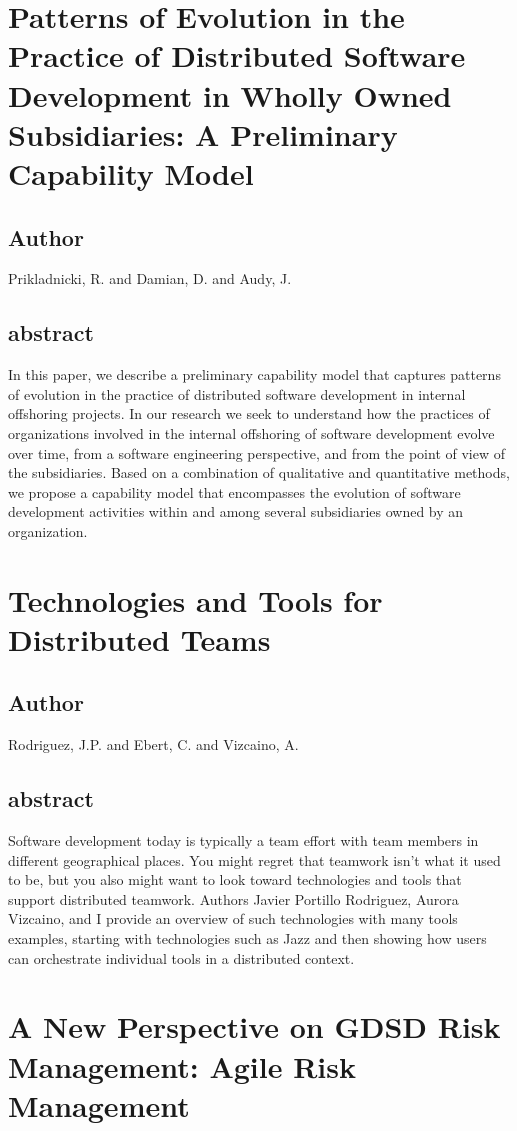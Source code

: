 \documentclass[lnbip,sechang,a4paper]{svmultln}
\begin{document}
\section{Patterns of Evolution in the Practice of Distributed Software
Development in Wholly Owned Subsidiaries: A Preliminary Capability Model}
\subsection{Author}
Prikladnicki, R. and Damian, D. and Audy, J.
\subsection{abstract}
In this paper, we describe a preliminary capability model that captures patterns
of evolution in the practice of distributed software development in internal
offshoring projects. In our research we seek to understand how the practices of organizations involved in the internal offshoring of software development evolve over time, from a software engineering perspective, and from the point of view of the subsidiaries. Based on a combination of qualitative and quantitative methods, we propose a capability model that encompasses the evolution of software development activities within and among several subsidiaries owned by an organization.
\cite{4638657}
\section{Technologies and Tools for Distributed Teams}
\subsection{Author}
Rodriguez, J.P. and Ebert, C. and Vizcaino, A.
\subsection{abstract}
Software development today is typically a team effort with team members in
different geographical places. You might regret that teamwork isn't what it used
to be, but you also might want to look toward technologies and tools that support distributed teamwork. Authors Javier Portillo Rodriguez, Aurora Vizcaino, and I provide an overview of such technologies with many tools examples, starting with technologies such as Jazz and then showing how users can orchestrate individual tools in a distributed context.
\cite{5551012}
\section{A New Perspective on GDSD Risk Management: Agile Risk Management}
\end{document}
